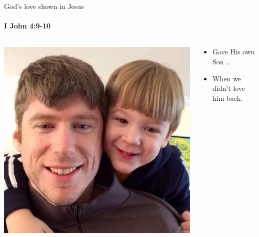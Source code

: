 \begin{frame}{God's love shown in Jesus}
\framesubtitle{I John 4:9-10}
\begin{columns}[c]
\begin{column}{0.5\textwidth}
	\includegraphics[width=\columnwidth]{figures/toddAndEzra.jpg}
\end{column}
\begin{column}{0.5\textwidth}
	\begin{itemize}
    \item Gave His own Son \ldots
    \item When we didn't love him back.
	\end{itemize}
\end{column}
\end{columns}

\end{frame}

